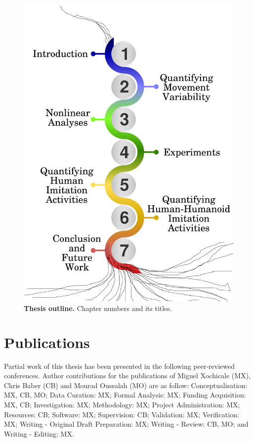 \begin{figure}
\centering
\includegraphics[width=1.0\textwidth]{thesis-structure-v04}
    \caption{
	{\bf Thesis outline.}
	Chapter numbers and its titles.
	  }
    \label{fig:thesis-outline}
\end{figure}


\section{Publications}
Partial work of this thesis has been presented in the following peer-reviewed 
conferences. Author contributions for the publications of 
Miguel Xochicale (MX), Chris Baber (CB) and Mourad Oussalah (MO) are as follow:
Conceptualisation: MX, CB, MO;
Data Curation: MX;
Formal Analysis: MX;
Funding Acquisition: MX, CB;
Investigation: MX;
Methodology: MX;
Project Administration: MX;
Resources: CB;
Software: MX;
Supervision: CB;
Validation: MX;
Verification: MX;
Writing - Original Draft Preparation: MX;
Writing - Review: CB, MO; and 
Writing - Editing: MX.

